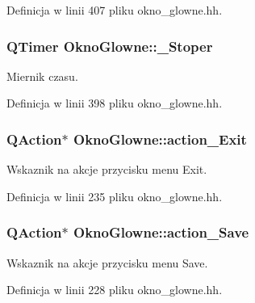 Definicja w linii 407 pliku okno\+\_\+glowne.\+hh.

\hypertarget{class_okno_glowne_a5d047f90666212f58e69d11af3285d9b}{}
\subsubsection[{\+\_\+\+Stoper}]{\setlength{\rightskip}{0pt plus 5cm}Q\+Timer Okno\+Glowne\+::\+\_\+\+Stoper\hspace{0.3cm}{\ttfamily [private]}}\label{class_okno_glowne_a5d047f90666212f58e69d11af3285d9b}
Miernik czasu. 

Definicja w linii 398 pliku okno\+\_\+glowne.\+hh.

\hypertarget{class_okno_glowne_a579ef9901f57057368cb522ea5a9a5c3}{}
\subsubsection[{action\+\_\+\+Exit}]{\setlength{\rightskip}{0pt plus 5cm}Q\+Action$\ast$ Okno\+Glowne\+::action\+\_\+\+Exit\hspace{0.3cm}{\ttfamily [private]}}\label{class_okno_glowne_a579ef9901f57057368cb522ea5a9a5c3}
Wskaznik na akcje przycisku menu Exit. 

Definicja w linii 235 pliku okno\+\_\+glowne.\+hh.

\hypertarget{class_okno_glowne_a2c2d825b6e5e0faa5eb368be4fc73b78}{}
\subsubsection[{action\+\_\+\+Save}]{\setlength{\rightskip}{0pt plus 5cm}Q\+Action$\ast$ Okno\+Glowne\+::action\+\_\+\+Save\hspace{0.3cm}{\ttfamily [private]}}\label{class_okno_glowne_a2c2d825b6e5e0faa5eb368be4fc73b78}
Wskaznik na akcje przycisku menu Save. 

Definicja w linii 228 pliku okno\+\_\+glowne.\+hh.

\hypertarget{class_okno_glowne_ae6e8681e77286aae1f4025ee5ba1ad69}{}
